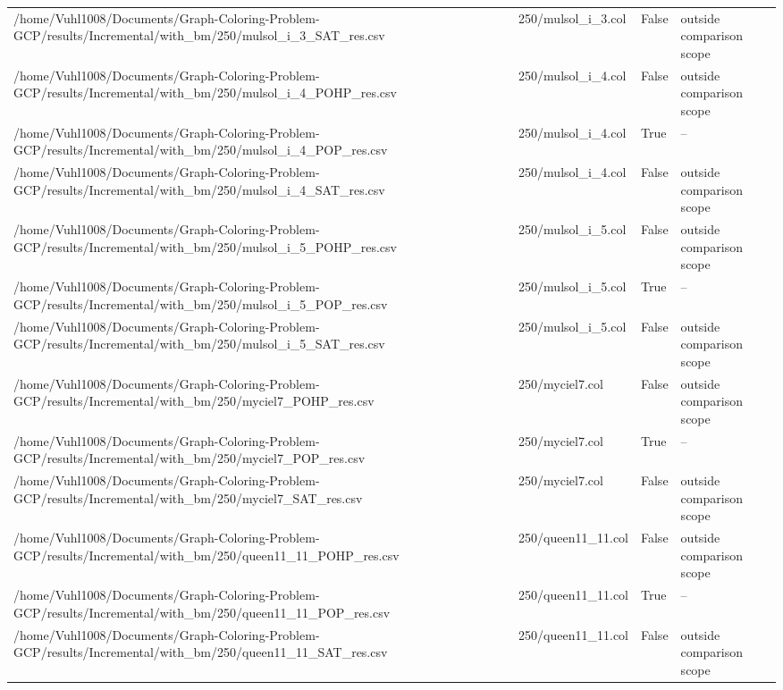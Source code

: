 \begin{table}[htbp]
\begin{tabular}{llll}
/home/Vuhl1008/Documents/Graph-Coloring-Problem-GCP/results/Incremental/with\_bm/250/mulsol\_i\_3\_SAT\_res.csv & 250/mulsol\_i\_3.col & False & outside comparison scope \\
/home/Vuhl1008/Documents/Graph-Coloring-Problem-GCP/results/Incremental/with\_bm/250/mulsol\_i\_4\_POHP\_res.csv & 250/mulsol\_i\_4.col & False & outside comparison scope \\
/home/Vuhl1008/Documents/Graph-Coloring-Problem-GCP/results/Incremental/with\_bm/250/mulsol\_i\_4\_POP\_res.csv & 250/mulsol\_i\_4.col & True & -- \\
/home/Vuhl1008/Documents/Graph-Coloring-Problem-GCP/results/Incremental/with\_bm/250/mulsol\_i\_4\_SAT\_res.csv & 250/mulsol\_i\_4.col & False & outside comparison scope \\
/home/Vuhl1008/Documents/Graph-Coloring-Problem-GCP/results/Incremental/with\_bm/250/mulsol\_i\_5\_POHP\_res.csv & 250/mulsol\_i\_5.col & False & outside comparison scope \\
/home/Vuhl1008/Documents/Graph-Coloring-Problem-GCP/results/Incremental/with\_bm/250/mulsol\_i\_5\_POP\_res.csv & 250/mulsol\_i\_5.col & True & -- \\
/home/Vuhl1008/Documents/Graph-Coloring-Problem-GCP/results/Incremental/with\_bm/250/mulsol\_i\_5\_SAT\_res.csv & 250/mulsol\_i\_5.col & False & outside comparison scope \\
/home/Vuhl1008/Documents/Graph-Coloring-Problem-GCP/results/Incremental/with\_bm/250/myciel7\_POHP\_res.csv & 250/myciel7.col & False & outside comparison scope \\
/home/Vuhl1008/Documents/Graph-Coloring-Problem-GCP/results/Incremental/with\_bm/250/myciel7\_POP\_res.csv & 250/myciel7.col & True & -- \\
/home/Vuhl1008/Documents/Graph-Coloring-Problem-GCP/results/Incremental/with\_bm/250/myciel7\_SAT\_res.csv & 250/myciel7.col & False & outside comparison scope \\
/home/Vuhl1008/Documents/Graph-Coloring-Problem-GCP/results/Incremental/with\_bm/250/queen11\_11\_POHP\_res.csv & 250/queen11\_11.col & False & outside comparison scope \\
/home/Vuhl1008/Documents/Graph-Coloring-Problem-GCP/results/Incremental/with\_bm/250/queen11\_11\_POP\_res.csv & 250/queen11\_11.col & True & -- \\
/home/Vuhl1008/Documents/Graph-Coloring-Problem-GCP/results/Incremental/with\_bm/250/queen11\_11\_SAT\_res.csv & 250/queen11\_11.col & False & outside comparison scope \\

\end{tabular}
\end{table}
